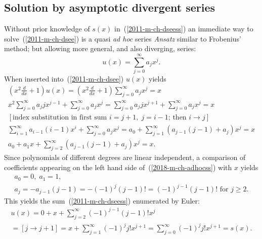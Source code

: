 \subsection*{Solution by asymptotic divergent series}
Without prior knowledge of $s(x)$ in~(\ref{2011-m-ch-dseess}) an
immediate way to solve~(\ref{2011-m-ch-dsee}) is a quasi {\em ad hoc} series {\it Ansatz}
similar to Frobenius' method; but allowing more general, and also diverging, series:
\begin{equation}
u(x)= \sum_{j=0}^\infty a_jx^j.
\end{equation}
When inserted into~(\ref{2011-m-ch-dsee}) $u(x)$ yields
\begin{equation}
\begin{split}
\left(x^2 \frac{d}{dx} +1\right) u(x) =
\left(x^2 \frac{d}{dx} +1\right) \sum_{j=0}^\infty a_jx^j = {x} \\
x^2 \sum_{j=0}^\infty a_j j x^{j-1} + \sum_{j=0}^\infty a_jx^j =
\sum_{j=0}^\infty a_j j x^{j+1} + \sum_{j=0}^\infty a_jx^j = {x} \\
  \left[\text{index substitution in first sum } i= j+1,\; j=i-1 \text{; then } i \rightarrow j\right]  \\
\sum_{i=1}^\infty a_{i-1} (i-1) x^i + \sum_{j=0}^\infty a_j x^j =
a_0 + \sum_{j=1}^\infty \left(a_{j-1} (j-1) +  a_j \right) x^j = x \\
a_0 + a_1 x + \sum_{j=2}^\infty \left(a_{j-1} (j-1) +  a_j \right) x^j = x
.
\end{split}
\label{2018-m-ch-adhocss}
\end{equation}
Since polynomials of different degrees are linear independent,
a comparison of coefficients appearing on the left hand side of~(\ref{2018-m-ch-adhocss}) with $x$
yields
\begin{equation}
\begin{split}
a_0 =0,
\;
a_1 = 1,
\\
a_j =  - a_{j-1} (j-1)  = - (-1)^j (j-1)!= (-1)^{j-1} (j-1)! \text{ for } j \ge 2
.
\end{split}
\label{2018-m-ch-adhocss1}
\end{equation}
This yields the sum~(\ref{2011-m-ch-dseess}) enumerated by Euler:
\begin{equation}
\begin{split}
u(x) = 0+ x +\sum_{j=2}^\infty (-1)^{j-1} (j-1)! x^j \\
=[j\rightarrow j+1] = x +\sum_{j=1}^\infty (-1)^{j} j! x^{j+1}
=  \sum_{j=0}^\infty (-1)^{j} j! x^{j+1} = s(x)
.
\end{split}
\label{2018-m-ch-adhocss12}
\end{equation}


